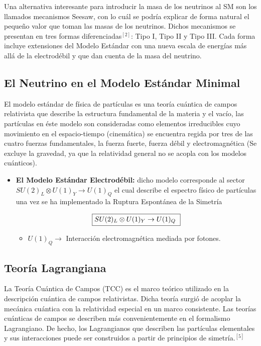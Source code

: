 \documentclass[12pt]{article}
\begin{document}
Una alternativa interesante para introducir la masa de los neutrinos al SM son los llamados mecanismos Seesaw, con lo cuál se podría explicar de forma natural el pequeño valor que toman las masas de los neutrinos. Dichos mecanismos se presentan en tres formas diferenciadas$^{[2]}$: Tipo I, Tipo II y Tipo III. Cada forma incluye extensiones del Modelo Estándar con una nueva escala de energías más allá de la electrodébil y que dan cuenta de la masa del neutrino.

\subsection{\textbf{El Neutrino en el Modelo Estándar Minimal}} El modelo estándar de física de partículas es una teoría cuántica de campos relativista que describe la estructura fundamental de la materia y el vacío, las partículas en éste modelo son consideradas como elementos irreducibles cuyo movimiento en el espacio-tiempo (cinemática) se encuentra regida por tres de las cuatro fuerzas fundamentales, la fuerza fuerte, fuerza débil y electromagnética (Se excluye la gravedad, ya que la relatividad general no se acopla con los modelos cuánticos).


\begin{itemize}
\item \textbf {El Modelo Estándar Electrodébil:} dicho modelo corresponde al  sector \(SU(2)_L\otimes U(1)_Y \rightarrow U(1)_Q \) el cual describe el espectro físico de partículas una vez se ha implementado la Ruptura Espontánea de la Simetría

\begin{equation}
\fbox{$SU(2)_L\otimes U(1)_Y \rightarrow U(1)_Q$ }
\label{eq:1}
\end{equation} 

\begin{itemize}
\item \(U(1)_Q \rightarrow \) Interacción electromagnética mediada por fotones. %
\end{itemize} 
\end{itemize} 


\subsection{Teoría Lagrangiana}


La Teoría Cuántica de Campos (TCC) es el marco teórico utilizado en la descripción cuántica de campos relativistas. Dicha teoría surgió de acoplar la mecánica cuántica con la relatividad especial en un marco consistente. Las teorías cuánticas de campos se describen más convenientemente en el formalismo Lagrangiano. De hecho, los Lagrangianos que describen las partículas elementales y sus interacciones puede ser construidos a partir de principios de simetría.$^{[5]}$ \\
\end{document}
